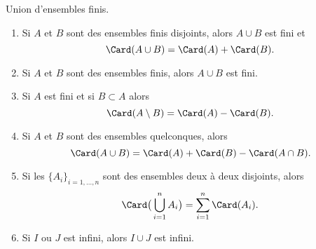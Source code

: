 \begin{lemma}       \label{LEMooVFPNooVmdUXY}
	Union d'ensembles finis.
	\begin{enumerate}
		\item       \label{ITEMooBUCZooYLCuIe}
		      Si \( A\) et \( B\) sont des ensembles finis disjoints, alors \( A\cup B\) est fini et
		      \begin{equation}
			      \Card(A\cup B)=\Card(A) + \Card(B).
		      \end{equation}
		\item       \label{ITEMooCCWOooYwgGBp}
		      Si \( A\) et \( B\) sont des ensembles finis, alors \( A\cup B\) est fini.
		\item       \label{ITEMooYJSZooXQXkOX}
		      Si \( A\) est fini et si \( B\subset A\) alors
		      \begin{equation}
			      \Card(A\setminus B)=\Card(A)-\Card(B).
		      \end{equation}
		\item       \label{ITEMooSWJCooEpBVkG}
		      Si \( A\) et \( B\) sont des ensembles quelconques, alors
		      \begin{equation}
			      \Card(A\cup B)=\Card(A)+\Card(B)-\Card(A\cap B).
		      \end{equation}
		\item       \label{ITEMooJDUUooVMvAOn}
		      Si les \( \{ A_i \}_{i=1,\ldots, n}\) sont des ensembles deux à deux disjoints, alors
		      \begin{equation}
			      \Card\big( \bigcup_{i=1}^nA_i \big)=\sum_{i=1}^n\Card(A_i).
		      \end{equation}
		\item \label{ITEMooNMFSooBvsNyq}
		      Si \( I\) ou \( J\) est infini, alors \( I \cup J\) est infini.
	\end{enumerate}
\end{lemma}

